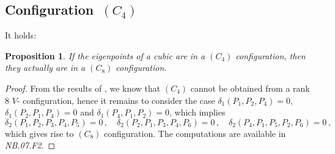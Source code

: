 \documentclass[a4paper, 11pt, reqno]{amsart}
\theoremstyle{plain}
\newtheorem{prop}[lemma]{Proposition}
\theoremstyle{definition}
\newcommand{\nb}[2]{\textsl{{NB}.{#1}.{#2}}}
\begin{document}
\subsection*{Configuration~\texorpdfstring{$(C_4)$}{C4}}
It holds:
\begin{prop}
If the eigenpoints of a cubic are in a $(C_4)$ configuration, then they actually are in a $(C_8)$ configuration.
\end{prop}
\begin{proof} 
From the results of , we know that $(C_4)$
cannot be obtained from a rank $8$ $V$- configuration,
hence it remains to consider the case $\delta_1(P_1, P_2, P_4) = 0$,
$\delta_1(P_2, P_1, P_4) = 0$ and $\delta_1(P_4, P_1, P_2) = 0$,
which implies
%
\[
  \delta_2(P_1, P_2, P_3, P_4, P_5) = 0 \,, \quad
  \delta_2(P_2, P_1, P_3, P_4, P_6) = 0 \,, \quad
  \delta_2(P_4, P_1, P_5, P_2, P_6) = 0 \,,
\]
%
which gives rise to $(C_8)$ configuration. The computations are available in \nb{07}{F2}.
\end{proof}
\end{document}
